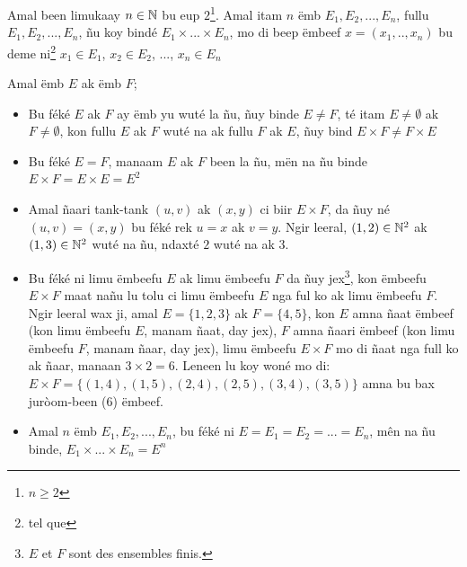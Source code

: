 \documentclass[twoside, a4paper]{article}
\begin{document}
\begin{tcolorbox}[enhanced jigsaw,breakable,pad at break*=1mm, colback=red!5!white,colframe=white!75!black,title= Téeki,
    watermark color=white]
  Amal been limukaay $n \in \mathbb{N}$ bu eup $2$\footnote{$n\geq 2$}. Amal itam $n$ ëmb $E_1, E_2, ..., E_n$, fullu $E_1, E_2, ..., E_n$, ñu koy bindé $E_1 \times ... \times E_n$, mo di beep ëmbeef $x = (x_1,..,x_n)$ bu deme ni\footnote{tel que} $x_1 \in E_1$, $x_2 \in E_2$, ..., $x_n \in E_n$
\end{tcolorbox}


\begin{tcolorbox}[enhanced jigsaw,breakable,pad at break*=1mm,
    colback=yellow!5!white,colframe=white!75!black,title= Seetlu,
    watermark color=white]
  Amal ëmb $E$ ak ëmb $F$;
  \begin{itemize}
    \item Bu féké $E$ ak $F$ ay ëmb yu wuté la ñu, ñuy binde $E\neq F$, té itam $E\neq \emptyset$ ak $F\neq \emptyset$, kon fullu $E$ ak $F$ wuté na ak fullu $F$ ak $E$, ñuy bind $E\times F \neq F \times E$
    \item Bu féké $E = F$, manaam $E$ ak $F$ been la ñu, mën na ñu binde $E\times F = E \times E = E^2$
    \item Amal ñaari tank-tank $(u, v)$ ak $(x, y)$ ci biir $E\times F$, da ñuy né $(u, v) = (x, y)$ bu féké rek $u = x$ ak $v = y$. Ngir leeral, $(1,2) \in \mathbb{N}^2$ ak $(1,3)\in \mathbb{N}^2$ wuté na ñu, ndaxté $2$ wuté na ak $3$.
    \item Bu féké ni limu ëmbeefu $E$ ak limu ëmbeefu $F$ da ñuy jex\footnote{$E$ et $F$ sont des ensembles finis.}, kon ëmbeefu $E\times F$ maat nañu lu tolu ci limu ëmbeefu $E$ nga ful ko ak limu ëmbeefu $F$. Ngir leeral wax ji, amal $E=\{1,2,3\}$ ak $F = \{4,5\}$, kon $E$ amna ñaat ëmbeef (kon limu ëmbeefu $E$, manam ñaat, day jex), $F$ amna ñaari ëmbeef (kon limu ëmbeefu $F$, manam ñaar, day jex), limu ëmbeefu $E\times F$ mo di ñaat nga full ko ak ñaar, manaan $3\times 2=6$. Leneen lu koy woné mo di: $E\times F =\big\{(1,4), (1,5), (2,4), (2,5), (3,4), (3,5)\big\}$ amna bu bax juròom-been (6) ëmbeef.
  \end{itemize}
  \begin{itemize}
    \item Amal $n$ ëmb $E_1, E_2, ..., E_n$, bu féké ni $E=E_1=E_2=...=E_n$, mên na ñu binde,  $E_1 \times ... \times E_n = E^n$
  \end{itemize}
\end{tcolorbox}
\end{document}

